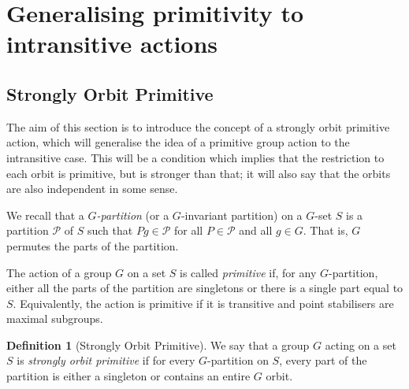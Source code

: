 \documentclass[11pt,a4paper]{amsart}
\theoremstyle{definition}
\newtheorem{definition}[theorem]{Definition}
\theoremstyle{remark}
\begin{document}
\section{Generalising primitivity to intransitive actions}\label{sec:blocks}



\subsection*{Strongly Orbit Primitive}

The aim of this section is to introduce the concept of a strongly orbit primitive action, which will generalise the idea of a primitive group action to the intransitive case. This will be a condition which implies that the restriction to each orbit is primitive, but is stronger than that; it will also say that the orbits are also independent in some sense. 

We recall that a \emph{$G$-partition} (or a $G$-invariant partition) on a $G$-set $S$ is a partition $\mathcal{P}$ of $S$ such that $Pg \in \mathcal{P}$ for all $P \in \mathcal{P}$ and all $g \in G$. That is, $G$ permutes the parts of the partition. 

The action of a group $G$ on a set $S$ is called \emph{primitive} if, for any $G$-partition, either all the parts of the partition are singletons or there is a single part equal to $S$. Equivalently, the action is primitive if it is transitive and point stabilisers are maximal subgroups. 


\begin{definition}[Strongly Orbit Primitive]
	\label{def:stronglyorbitprimitive}
	We say that a group $G$ acting on a set $S$ is \emph{strongly orbit primitive} if for every $G$-partition on $S$, every part of the partition is either a singleton or contains an entire $G$ orbit. 
\end{definition}
\end{document}
